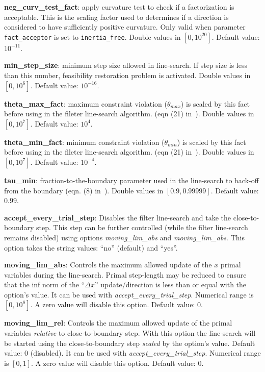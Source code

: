 \noindent \textbf{neg\_curv\_test\_fact}: apply curvature test to check if a factorization is acceptable. This is the scaling factor used to determines if a direction is considered to have sufficiently positive curvature. Only valid when parameter \texttt{fact\_acceptor} is set to \texttt{inertia\_free}. Double values in $[0, 10^{20}]$. Default value: $10^{-11}$.
\medskip

\noindent \textbf{min\_step\_size}: minimum step size allowed in line-search. If step size is less than this number, feasibility restoration problem is activated. Double values in $[0, 10^{6}]$. Default value: $10^{-16}$.
\medskip
 
\noindent \textbf{theta\_max\_fact}: maximum constraint violation ($\theta_{max}$) is scaled by this fact before using in the fileter line-search algorithm. (eqn (21) in~\cite{waecther_05_ipopt0}). Double values in $[0, 10^7]$. Default value: $10^{4}$.
\medskip

\noindent \textbf{theta\_min\_fact}: minimum constraint violation ($\theta_{min}$) is scaled by this fact before using in the fileter line-search algorithm. (eqn (21) in~\cite{waecther_05_ipopt0}). Double values in $[0, 10^7]$. Default value: $10^{-4}$.
\medskip

\noindent \textbf{tau\_min}: fraction-to-the-boundary parameter used in the line-search to back-off from the boundary (eqn. (8) in~\cite{waecther_05_ipopt0}). Double values in $[0.9, 0.99999]$. Default value: $0.99$. 
\medskip

\noindent \textbf{accept\_every\_trial\_step}: Disables the filter line-search and take the close-to-boundary step. This step can be further controlled (while the filter line-search remains disabled) using options \textit{moving\_lim\_abs} and \textit{moving\_lim\_abs}. This option takes the string values: ``no'' (default) and ``yes''.
\medskip

\noindent \textbf{moving\_lim\_abs}: Controls the maximum allowed update of the $x$ primal variables during the line-search. Primal step-length may be reduced to ensure that the inf norm of the ``$\Delta x$'' update/direction is less than or equal with the option's value. It can be used with \textit{accept\_every\_trial\_step}. Numerical range is $[0,10^8]$. A zero value will disable this option. Default value: 0. 
\medskip

\noindent \textbf{moving\_lim\_rel}: Controls the maximum allowed update of the primal variables \textit{relative} to close-to-boundary step. With this option the line-search will be started using the close-to-boundary step \textit{scaled} by the option's value. Default value: 0 (disabled). It can be used with \textit{accept\_every\_trial\_step}. Numerical range is $[0,1]$. A zero value will disable this option. Default value: 0. 
\medskip

